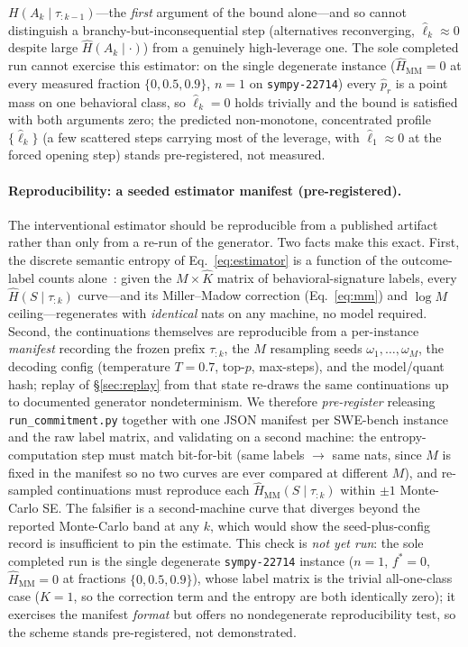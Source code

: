 \documentclass[11pt]{article}
\newcommand{\Hk}{\widehat{H}\!\left(S \mid \tau_{:k}\right)}
\newcommand{\strat}{S}
\begin{document}
$H(A_k\mid\tau_{:k-1})$---the \emph{first} argument of the bound alone---and so
cannot distinguish a branchy-but-inconsequential step (alternatives reconverging,
$\widehat\ell_k\approx0$ despite large $\widehat H(A_k\mid\cdot)$) from a genuinely
high-leverage one. The sole completed run cannot exercise this estimator: on the
single degenerate instance ($\widehat{H}_{\mathrm{MM}}=0$ at every measured
fraction $\{0,0.5,0.9\}$, $n\!=\!1$ on \texttt{sympy-22714}) every $\hat p_r$ is a
point mass on one behavioral class, so $\widehat\ell_k=0$ holds trivially and the
bound is satisfied with both arguments zero; the predicted non-monotone,
concentrated profile $\{\widehat\ell_k\}$ (a few scattered steps carrying most of
the leverage, with $\widehat\ell_1\approx0$ at the forced opening step) stands
pre-registered, not measured.

\paragraph{Reproducibility: a seeded estimator manifest (pre-registered).}
The interventional estimator should be reproducible from a published artifact rather
than only from a re-run of the generator. Two facts make this exact. First, the
discrete semantic entropy of Eq.~\eqref{eq:estimator} is a function of the
outcome-label counts alone~\citep{farquhar2024semantic,kuhn2023semantic}: given the
$M\times\hat K$ matrix of behavioral-signature labels, every $\Hk$ curve---and its
Miller--Madow correction (Eq.~\eqref{eq:mm}) and $\log M$ ceiling---regenerates with
\emph{identical} nats on any machine, no model required. Second, the continuations
themselves are reproducible from a per-instance \emph{manifest} recording the frozen
prefix $\tau_{:k}$, the $M$ resampling seeds $\omega_1,\dots,\omega_M$, the decoding
config (temperature $T=0.7$, top-$p$, max-steps), and the model/quant hash; replay of
\S\ref{sec:replay} from that state re-draws the same continuations up to documented
generator nondeterminism. We therefore \emph{pre-register} releasing
\texttt{run\_commitment.py} together with one JSON manifest per SWE-bench instance and
the raw label matrix, and validating on a second machine: the entropy-computation
step must match bit-for-bit (same labels $\to$ same nats, since $M$ is fixed in the
manifest so no two curves are ever compared at different $M$), and re-sampled
continuations must reproduce each $\widehat H_{\mathrm{MM}}(\strat\mid\tau_{:k})$
within $\pm 1$ Monte-Carlo SE. The falsifier is a second-machine curve that diverges
beyond the reported Monte-Carlo band at any $k$, which would show the seed-plus-config
record is insufficient to pin the estimate. This check is \emph{not yet run}: the sole
completed run is the single degenerate \texttt{sympy-22714} instance ($n\!=\!1$,
$f^\ast=0$, $\widehat{H}_{\mathrm{MM}}=0$ at fractions $\{0,0.5,0.9\}$), whose label
matrix is the trivial all-one-class case ($\hat K=1$, so the correction term and the
entropy are both identically zero); it exercises the manifest \emph{format} but offers
no nondegenerate reproducibility test, so the scheme stands pre-registered, not
demonstrated.
\end{document}
